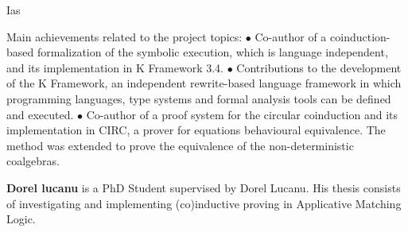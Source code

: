\begin{sitedescription}{Ias}
\begin{compactitem}
Main achievements related to the project topics:
$\bullet$ Co-author of a coinduction-based formalization of the symbolic execution, which is language independent, and its implementation in K Framework 3.4.
$\bullet$ Contributions to the development of the K Framework, an independent rewrite-based language framework in which programming languages, type systems and formal analysis tools can be defined and executed.
$\bullet$ Co-author of a proof system for the circular coinduction and its implementation in CIRC, a prover for equations behavioural equivalence. The method was extended to prove the equivalence of the non-deterministic coalgebras.
\item{\bf Dorel lucanu} is a PhD Student supervised by Dorel Lucanu. His thesis consists of investigating and implementing (co)inductive proving in Applicative Matching Logic.
\end{compactitem}

\end{sitedescription}

